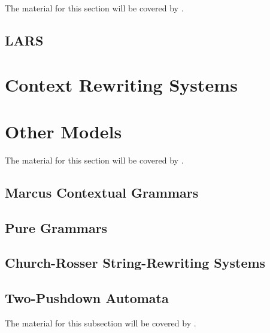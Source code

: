 The material for this section will be covered by \cite{delaHiguera2010, Eyraud2007}.

\subsection{LARS}

\section{Context Rewriting Systems}
\label{section:context-rewriting-systems}

\section{Other Models}
\label{section:other-models}

The material for this section will be covered by \cite{C10Diploma}.

\subsection{Marcus Contextual Grammars}

\subsection{Pure Grammars}

\subsection{Church-Rosser String-Rewriting Systems}

\subsection{Two-Pushdown Automata}

The material for this subsection will be covered by \cite{NO98}.